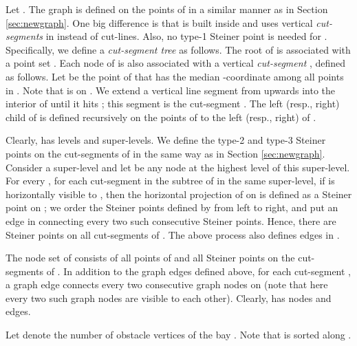 \documentclass[english,runningheads,11pt]{llncs}
\begin{document}
Let . The graph  is defined on the points
of  in a similar manner as  in Section \ref{sec:newgraph}. One big difference is that  is built inside  and uses vertical {\em cut-segments} in 
instead of cut-lines. Also, no type-1 Steiner point is needed for .
Specifically, we define a {\em cut-segment tree}  as follows. The root  of  is associated with a point set . Each node  of  is also associated with a vertical {\em cut-segment}
, defined as follows. Let  be the point of  that has the median -coordinate among all
points in . Note that  is on . We extend a vertical line
segment from  upwards into the interior of  until it hits ; this segment is the cut-segment .
The left (resp., right) child of  is defined recursively on the points of  to the left (resp., right) of .

Clearly,  has  levels and 
super-levels. We define the type-2 and type-3 Steiner points on the cut-segments of 
in the same way as in Section \ref{sec:newgraph}.
Consider a super-level and let  be any node at the highest level of this super-level. For
every , for each cut-segment  in the subtree  of  in the same super-level,
if  is horizontally visible to , then the horizontal projection  of  on  is defined as a Steiner point on ; we order the Steiner points defined by  from left to right,
and put an edge in  connecting every two such consecutive Steiner points.
Hence, there are  Steiner points on all cut-segments
of . The above process also defines  edges in .

The node set of  consists of all points of  and all Steiner points on the
cut-segments of . In addition to the graph edges defined above, for each cut-segment ,
a graph edge connects every two consecutive graph nodes on 
(note that here every two such graph nodes are visible to each other).
Clearly,  has  nodes and   edges.

Let  denote the number of obstacle vertices of the bay .
Note that  is sorted along .
\end{document}
